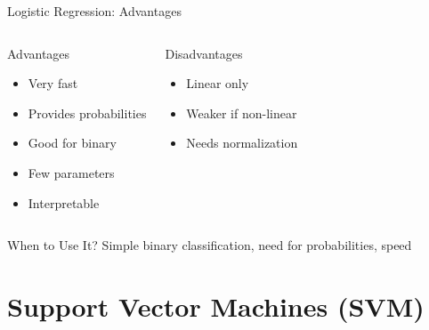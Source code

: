 \documentclass[aspectratio=169]{beamer}
\begin{document}
\begin{frame}{Logistic Regression: Advantages}
\begin{columns}[T]
\begin{block}{Advantages}
\begin{itemize}
    \item Very fast
    \item Provides probabilities
    \item Good for binary
    \item Few parameters
    \item Interpretable
\end{itemize}
\end{block}

\begin{block}{Disadvantages}
\begin{itemize}
    \item Linear only
    \item Weaker if non-linear
    \item Needs normalization
\end{itemize}
\end{block}
\end{columns}

\vspace{0.5cm}
\begin{alertblock}{When to Use It?}
Simple binary classification, need for probabilities, speed
\end{alertblock}
\end{frame}

\section{Support Vector Machines (SVM)}
\end{document}
